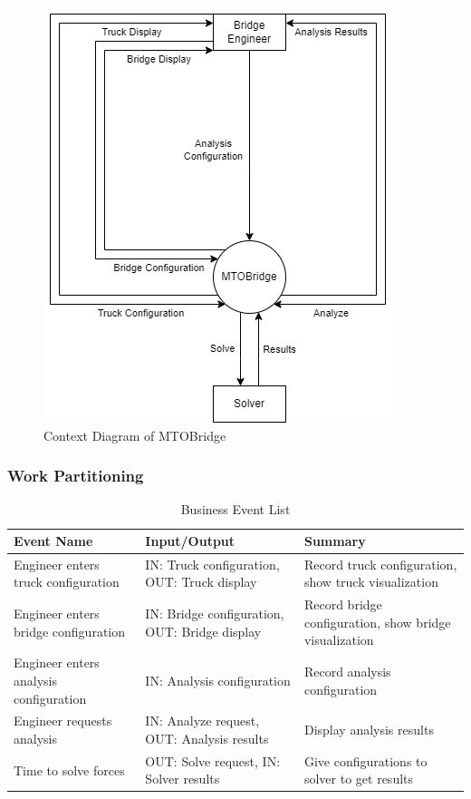 \documentclass[12pt]{article}
\begin{document}
\begin{figure}[H]
  \includegraphics[]{context-diagram.png}
  \caption{Context Diagram of MTOBridge}
  \label {fig:context-diagram}
\end{figure}

\subsubsection{Work Partitioning}

\begin{table}[hp]
  \caption{Business Event List} \label{TblEventList}
  \begin{tabular}{p{} | p{} | p{}}
  \toprule
  \textbf{Event Name} & \textbf{Input/Output} & \textbf{Summary}\\
  \midrule
  Engineer enters truck configuration & IN: Truck configuration, OUT: Truck display & Record truck configuration, show truck visualization\\
  \midrule
  Engineer enters bridge configuration & IN: Bridge configuration, OUT: Bridge display & Record bridge configuration, show bridge visualization\\
  \midrule
  Engineer enters analysis configuration & IN: Analysis configuration & Record analysis configuration\\
  \midrule
  Engineer requests analysis & IN: Analyze request, OUT: Analysis results & Display analysis results\\
  \midrule
  Time to solve forces & OUT: Solve request, IN: Solver results & Give configurations to solver to get results\\
  \bottomrule
\end{tabular}
\end{table}
\end{document}
